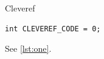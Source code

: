 \documentclass[aspectratio=169,10pt]{beamer}
\begin{document}
\begin{frame}[fragile]{Cleveref}
	\begin{lstlisting}[caption={A listing},label={lst:one}]
int CLEVEREF_CODE = 0;
	\end{lstlisting}
	See \cref{lst:one}.
\end{frame}
\end{document}
